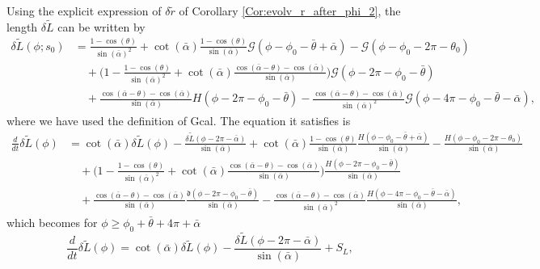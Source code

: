\documentclass[reqno]{amsart}
\theoremstyle{definition} \newtheorem{definition}{Definition}[section]
\theoremstyle{definition} \newtheorem{remark}[definition]{Remark}
\theoremstyle{plain} \newtheorem{lemma}[definition]{Lemma}
\theoremstyle{plain} \newtheorem{proposition}[definition]{Proposition}
\theoremstyle{plain} \newtheorem{theorem}[definition]{Theorem}
\theoremstyle{plain} \newtheorem{corollary}[definition]{Corollary}
\theoremstyle{definition} \newtheorem{example}[definition]{Example}
\theoremstyle{plain} \newtheorem{claim}[clai]{Claim}
\theoremstyle{definition} \newtheorem{assumption}[definition]{Assumption}
\theoremstyle{definition} \newtheorem{observation}[definition]{Observation}
\newcommand{\1}{\mathbbm 1}
\newcommand{\Diracd}{\mathfrak{d}}
\numberwithin{equation}{section} %
\theoremstyle{plain} \newtheorem*{theorem*}{Theorem}
\theoremstyle{plain} \newtheorem{mthm}[maintheorem]{Main Theorem}
\theoremstyle{plain} \newtheorem*{mthm*}{Main Theorem}
\theoremstyle{plain} \newtheorem*{conjecture*}{Conjecture}
\theoremstyle{plain} \newtheorem{conjecture}[definition]{Conjecture}
\theoremstyle{plain} \newtheorem*{problem*}{Problem}
\begin{document}
Using the explicit expression of $\delta \tilde r$ of Corollary \ref{Cor:evolv_r_after_phi_2}, the length $\delta \tilde L$ can be written by
\begin{equation}
\label{Equa:evolv_L_after_phi_2}
\begin{split}
\delta \tilde L(\phi;s_0) &= \frac{1 - \cos(\theta)}{\sin(\bar \alpha)^2} + \cot(\bar \alpha) \frac{1 - \cos(\theta)}{\sin(\bar \alpha)} \mathcal G(\phi - \phi_0 - \bar \theta + \bar \alpha) - \mathcal G(\phi - \phi_0 - 2\pi - \theta_0) \\
&\quad + \bigg( 1 - \frac{1 - \cos(\theta)}{\sin(\bar \alpha)^2} + \cot(\bar \alpha) \frac{\cos(\bar \alpha - \theta) - \cos(\bar \alpha)}{\sin(\bar \alpha)} \bigg) \mathcal G(\phi - 2\pi - \phi_0 - \bar \theta) \\
& \quad + \frac{\cos(\bar \alpha - \theta) - \cos(\bar \alpha)}{\sin(\bar \alpha)} H(\phi - 2\pi - \phi_0 - \bar \theta) - \frac{\cos(\bar \alpha - \theta) - \cos(\bar \alpha)}{\sin(\bar \alpha)^2} \mathcal G(\phi - 4\pi - \phi_0 - \bar \theta - \bar \alpha),
\end{split}
\end{equation}
where we have used the definition of \gls{Gcal}. The equation it satisfies is
\begin{align*}
\frac{d}{dt} \delta \tilde L(\phi) &= \cot(\bar \alpha) \delta \tilde L(\phi) - \frac{\delta \tilde L(\phi - 2\pi - \bar \alpha)}{\sin(\bar \alpha)} + \cot(\bar \alpha) \frac{1 - \cos(\theta)}{\sin(\bar \alpha)} \frac{H(\phi - \phi_0 - \bar \theta + \bar \alpha)}{\sin(\bar \alpha)} - \frac{H(\phi - \phi_0 - 2\pi - \theta_0)}{\sin(\bar \alpha)} \\
&\quad + \bigg( 1 - \frac{1 - \cos(\theta)}{\sin(\bar \alpha)^2} + \cot(\bar \alpha) \frac{\cos(\bar \alpha - \theta) - \cos(\bar \alpha)}{\sin(\bar \alpha)} \bigg) \frac{H(\phi - 2\pi - \phi_0 - \bar \theta)}{\sin(\bar \alpha)} \\
& \quad + \frac{\cos(\bar \alpha - \theta) - \cos(\bar \alpha)}{\sin(\bar \alpha)} \frac{\Diracd(\phi - 2\pi - \phi_0 - \bar \theta)}{\sin(\bar \alpha)} - \frac{\cos(\bar \alpha - \theta) - \cos(\bar \alpha)}{\sin(\bar \alpha)^2} \frac{H(\phi - 4\pi - \phi_0 - \bar \theta - \bar \alpha)}{\sin(\bar \alpha)},
\end{align*}
which becomes for $\phi \geq \phi_0 + \bar \theta + 4\pi + \bar \alpha$
\begin{equation*}
\frac{d}{dt} \delta \tilde L(\phi) = \cot(\bar \alpha) \delta \tilde L(\phi) - \frac{\delta \tilde L(\phi - 2\pi - \bar \alpha)}{\sin(\bar \alpha)} + S_L,
\end{equation*}
\end{document}
